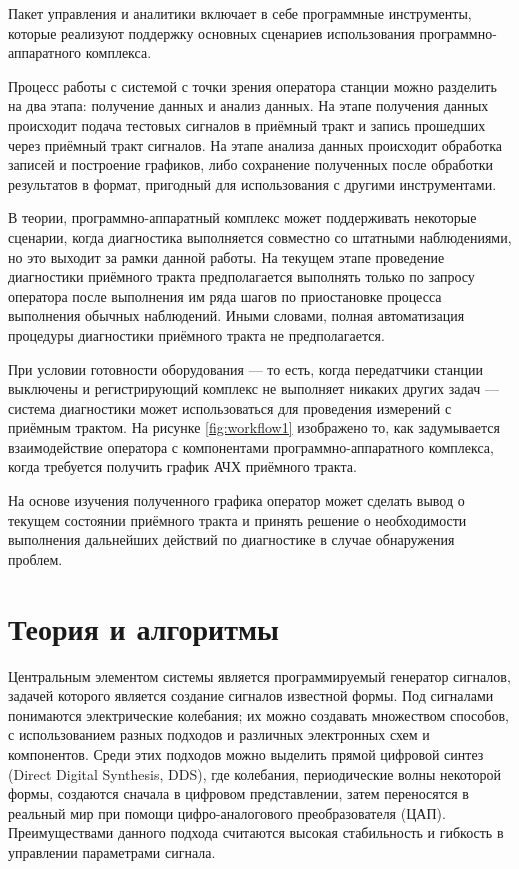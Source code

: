 \documentclass{report}
\begin{document}
Пакет управления и аналитики включает в себе программные инструменты, которые реализуют поддержку основных сценариев использования программно-аппаратного комплекса.

Процесс работы с системой с точки зрения оператора станции можно разделить на два этапа: получение данных и анализ данных. На этапе получения данных происходит подача тестовых сигналов в приёмный тракт и запись прошедших через приёмный тракт сигналов. На этапе анализа данных происходит обработка записей и построение графиков, либо сохранение полученных после обработки результатов в формат, пригодный для использования с другими инструментами.

В теории, программно-аппаратный комплекс может поддерживать некоторые сценарии, когда диагностика выполняется совместно со штатными наблюдениями, но это выходит за рамки данной работы. На текущем этапе проведение диагностики приёмного тракта предполагается выполнять только по запросу оператора после выполнения им ряда шагов по приостановке процесса выполнения обычных наблюдений. Иными словами, полная автоматизация процедуры диагностики приёмного тракта не предполагается.

При условии готовности оборудования --- то есть, когда передатчики станции выключены и регистрирующий комплекс не выполняет никаких других задач --- система диагностики может использоваться для проведения измерений с приёмным трактом. На рисунке \ref{fig:workflow1} изображено то, как задумывается взаимодействие оператора с компонентами программно-аппаратного комплекса, когда требуется получить график АЧХ приёмного тракта.


На основе изучения полученного графика оператор может сделать вывод о текущем состоянии приёмного тракта и принять решение о необходимости выполнения дальнейших действий по диагностике в случае обнаружения проблем.

\section{Теория и алгоритмы}

Центральным элементом системы является программируемый генератор сигналов, задачей которого является создание сигналов известной формы. Под сигналами понимаются электрические колебания; их можно создавать множеством способов, с использованием разных подходов и различных электронных схем и компонентов. Среди этих подходов можно выделить прямой цифровой синтез (Direct Digital Synthesis, DDS), где колебания, периодические волны некоторой формы, создаются сначала в цифровом представлении, затем переносятся в реальный мир при помощи цифро-аналогового преобразователя (ЦАП). Преимуществами данного подхода считаются высокая стабильность и гибкость в управлении параметрами сигнала.
\end{document}
